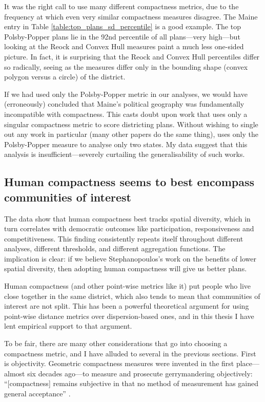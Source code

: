 \documentclass[]{article}
\begin{document}
It was the right call to use many different compactness metrics, due to
the frequency at which even very similar compactness measures disagree.
The Maine entry in Table \ref{table:top_plans_sd_percentile} is a good
example. The top Polsby-Popper plans lie in the 92nd percentile of all
plans---very high---but looking at the Reock and Convex Hull measures
paint a much less one-sided picture. In fact, it is surprising that the
Reock and Convex Hull percentiles differ so radically, seeing as the
measures differ only in the bounding shape (convex polygon versus a
circle) of the district.

If we had used only the Polsby-Popper metric in our analyses, we would
have (erroneously) concluded that Maine's political geography was
fundamentally incompatible with compactness. This casts doubt upon work
that uses only a singular compactness metric to score districting plans.
Without wishing to single out any work in particular (many other papers
do the same thing), \cite{s2020} uses only the Polsby-Popper measure to
analyse only two states. My data suggest that this analysis is
insufficient---severely curtailing the generalisability of such works.

\hypertarget{human-compactness-seems-to-best-encompass-communities-of-interest}{%
\subsection{Human compactness seems to best encompass communities of
interest}\label{human-compactness-seems-to-best-encompass-communities-of-interest}}

The data show that human compactness best tracks spatial diversity,
which in turn correlates with democratic outcomes like participation,
responsiveness and competitiveness. This finding consistently repeats
itself throughout different analyses, different thresholds, and
different aggregation functions. The implication is clear: if we believe
Stephanopoulos's work on the benefits of lower spatial diversity, then
adopting human compactness will give us better plans.

Human compactness (and other point-wise metrics like it) put people who
live close together in the same district, which also tends to mean that
communities of interest are not split. This has been a powerful
theoretical argument for using point-wise distance metrics over
dispersion-based ones, and in this thesis I have lent empirical support
to that argument.

To be fair, there are many other considerations that go into choosing a
compactness metric, and I have alluded to several in the previous
sections. First is objectivity. Geometric compactness measures were
invented in the first place---almost six decades ago---to measure and
prosecute gerrymandering objectively: ``{[}compactness{]} remains
subjective in that no method of measurement has gained general
acceptance'' \citep[p.~74]{reock1961}.
\end{document}
